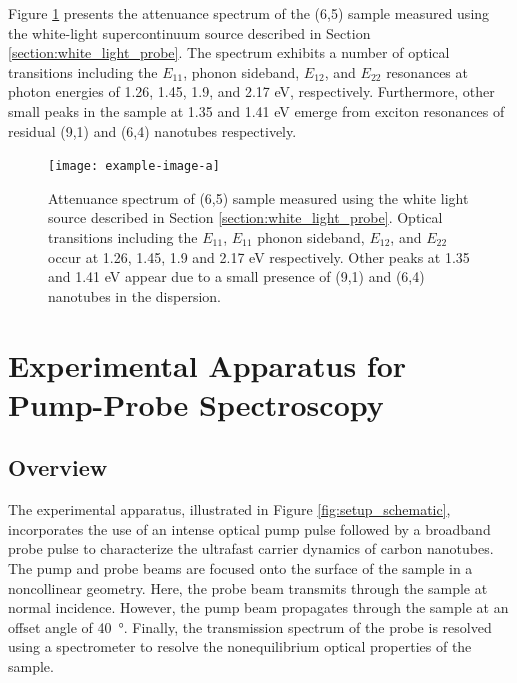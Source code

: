 Figure \ref{fig:sample_absorbance} presents the attenuance spectrum of the (6,5) sample measured using the white-light supercontinuum source described in Section \ref{section:white_light_probe}. The spectrum exhibits a number of optical transitions including the $E_{11}$, phonon sideband, $E_{12}$, and $E_{22}$ resonances at photon energies of 1.26, 1.45, 1.9, and 2.17 eV, respectively. Furthermore, other small peaks in the sample at 1.35 and 1.41 eV emerge from exciton resonances of residual (9,1) and (6,4) nanotubes respectively.

\begin{figure}[H]
	\centering
	\texttt{[image: example-image-a]}
	\caption{ Attenuance spectrum of (6,5) sample measured using the white light source described in Section \ref{section:white_light_probe}. Optical transitions including the $E_{11}$, $E_{11} $ phonon sideband, $E_{12}$, and $E_{22}$ occur at 1.26, 1.45, 1.9 and 2.17 eV respectively. Other peaks at 1.35 and 1.41 eV appear due to a small presence of (9,1) and (6,4) nanotubes in the dispersion.}
	\label{fig:sample_absorbance}
\end{figure}

\section{Experimental Apparatus for Pump-Probe Spectroscopy}

\subsection{Overview}
The experimental apparatus, illustrated in Figure \ref{fig:setup_schematic}, incorporates the use of an intense optical pump pulse followed by a broadband probe pulse to characterize the ultrafast carrier dynamics of carbon nanotubes. The pump and probe beams are focused onto the surface of the sample in a noncollinear geometry. Here, the probe beam transmits through the sample at normal incidence. However, the pump beam propagates through the sample at an offset angle of \SI{40}{\degree}. Finally, the transmission spectrum of the probe is resolved using a spectrometer to resolve the nonequilibrium optical properties of the sample.



